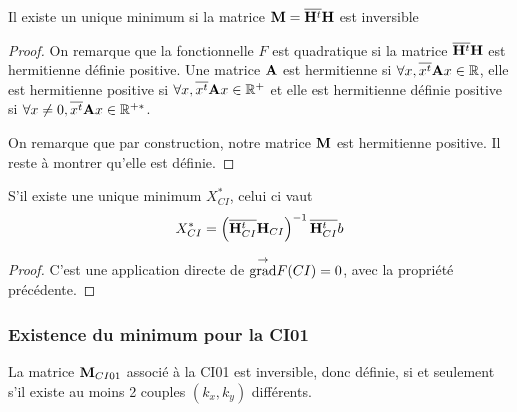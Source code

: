     \begin{prop}
      Il existe un unique minimum si la matrice \(\mathbf{M}={\overline{\mathbf{H}^t}}{\mathbf{H}}\) est inversible
    \end{prop}

    \begin{proof}
      On remarque que la fonctionnelle \(F\) est quadratique si la matrice \({\overline{\mathbf{H}^t}}{\mathbf{H}}\) est hermitienne définie positive. Une matrice \(\mathbf{A}\) est hermitienne si \(\forall x, {\overline{x^t}}\mathbf{A} x \in \mathbb R\), elle est hermitienne positive si \(\forall x, {\overline{x^t}}\mathbf{A} x \in \mathbb R^+\) et elle est hermitienne définie positive si \(\forall x\not=0, {\overline{x^t}}\mathbf{A} x \in \mathbb R^{+*}\).

      On remarque que par construction, notre matrice \(\mathbf{M}\) est hermitienne positive. Il reste à montrer qu'elle est définie.
    \end{proof}

    \begin{prop}
      S'il existe une unique minimum \(X_{CI}^*\), celui ci vaut
      \[
        X_{CI}^* = \left({\overline{\mathbf{H}_{CI}^t}}{\mathbf{H}_{CI}}\right)^{-1}{\overline{\mathbf{H}_{CI}^t}}b
      \]
    \end{prop}

    \begin{proof}
      C'est une application directe de \({{\overset{\rightarrow}{\operatorname{grad}}}}{} F(CI) = 0 \), avec la propriété précédente.
    \end{proof}

    \subsubsection{Existence du minimum pour la CI01}

      \begin{prop}
        La matrice \({\mathbf{M}}_{CI01}\) associé à la CI01 est inversible, donc définie, si et seulement s'il existe au moins 2 couples \((k_{x},k_{y})\) différents.
      \end{prop}

